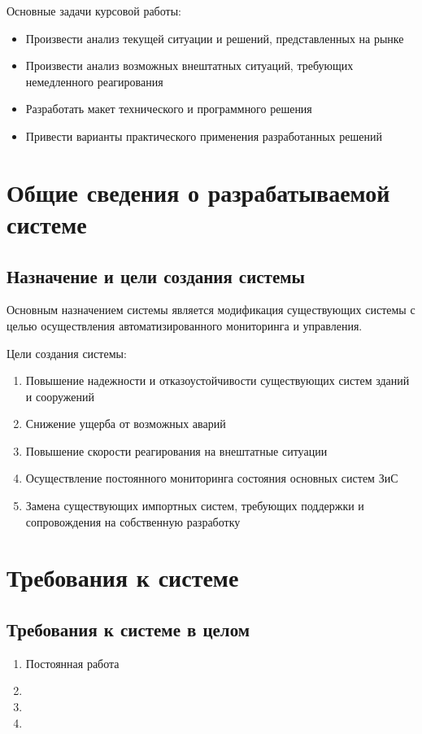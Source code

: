 Основные задачи курсовой работы:
\begin{itemize}
	\itemsep0em 
	\item Произвести анализ текущей ситуации и решений, представленных на рынке
	\item Произвести анализ возможных внештатных ситуаций, требующих немедленного реагирования
	\item Разработать макет технического и программного решения
	\item Привести варианты практического применения разработанных решений 
\end{itemize}


\newpage\section{Общие сведения о разрабатываемой системе}
\subsection{Назначение и цели создания системы}
Основным назначением системы является модификация существующих системы с целью осуществления автоматизированного мониторинга и управления.

Цели создания системы:
\begin{enumerate}
	\itemsep0em 
	\item Повышение надежности и отказоустойчивости существующих систем зданий и сооружений
	\item Снижение ущерба от возможных аварий
	\item Повышение скорости реагирования на внештатные ситуации
	\item Осуществление постоянного мониторинга состояния основных систем ЗиС
	\item Замена существующих импортных систем, требующих поддержки и сопровождения на собственную разработку
\end{enumerate}

\section{Требования к системе}
\subsection{Требования к системе в целом}
\begin{enumerate}
	\itemsep0em 
	\item Постоянная работа 
	\item 
	\item 
	\item 
\end{enumerate}

